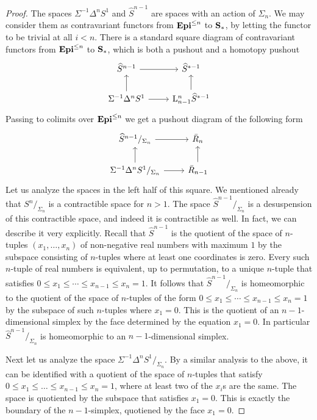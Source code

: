 \documentclass[psamsfonts]{amsart}
\theoremstyle{plain}
\theoremstyle{definition}
\theoremstyle{remark}
\newcommand{\catname}[1]{{\normalfont\textbf{#1}}}
\newcommand{\epi}{\catname{Epi}}
\newcommand{\spaces}{\catname{S}_*}
\newcommand{\lkan}{\mathrm{L}}
\begin{document}
\begin{proof}
The spaces $\Sigma^{-1}\Delta^n S^1$ and $\widehat S^{n-1}$ are spaces with an action of $\Sigma_n$. We may consider them as contravariant functors from $\epi^{\le n}$ to $\spaces$, by letting the functor to be trivial at all $i<n$. There is a standard square diagram of contravariant functors from $\epi^{\le n}$ to $\spaces$, which is both a pushout and a homotopy pushout
\[\begin{tikzcd}
	{\widehat S^{n-1}} & {\widehat S^{*-1}} \\
	{\Sigma^{-1}\Delta^nS^1} & {\lkan_{n-1}^n\widehat S^{*-1}}
	\arrow[from=1-1, to=1-2]
	\arrow[from=2-1, to=1-1]
	\arrow[from=2-1, to=2-2]
	\arrow[from=2-2, to=1-2]
\end{tikzcd}\]
Passing to colimits over $\epi^{\le n}$ we get a pushout diagram of the following form
\[\begin{tikzcd}
	{\widehat S^{n-1}/_{\Sigma_n}} & {\bar R_n} \\
	{\Sigma^{-1}\Delta^nS^1/_{\Sigma_n}} & {\bar R_{n-1}}
	\arrow[from=1-1, to=1-2]
	\arrow[from=2-1, to=1-1]
	\arrow[from=2-1, to=2-2]
	\arrow[from=2-2, to=1-2]
\end{tikzcd}\]
Let us analyze the spaces in the left half of this square. We mentioned already that $S^n/_{\Sigma_n}$ is a contractible space for $n>1$. The space $\widehat S^{n-1}/_{\Sigma_n}$ is a desuspension of this contractible space, and indeed it is contractible as well. In fact, we can describe it very explicitly. Recall that $\widehat S^{n-1}$ is the quotient of the space of $n$-tuples $(x_1, \ldots, x_n)$ of non-negative real numbers with maximum $1$ by the subspace consisting of $n$-tuples where at least one coordinates is zero. Every such $n$-tuple of real numbers is equivalent, up to permutation, to a unique $n$-tuple that satisfies $0\le x_1 \le \cdots \le x_{n-1}\le x_n=1$. It follows that $\widehat S^{n-1}/_{\Sigma_n}$ is homeomorphic to the quotient of the space of $n$-tuples of the form $0 \le x_1 \le \cdots \le x_{n-1}\le x_n=1$ by the subspace of such $n$-tuples where $x_1=0$. This is the quotient of an $n-1$-dimensional simplex by the face determined by the equation $x_1=0$. In particular $\widehat S^{n-1}/_{\Sigma_n}$ is homeomorphic to an $n-1$-dimensional simplex.

Next let us analyze the space ${\Sigma^{-1}\Delta^nS^1/_{\Sigma_n}}$. By a similar analysis to the above, it can be identified with a quotient of the space of $n$-tuples that satisfy $0\le x_1 \le \ldots \le x_{n-1}\le x_n = 1$, where at least two of the $x_i$s are the same. The space is quotiented by the subspace that satisfies $x_1=0$. This is exactly the boundary of the $n-1$-simplex, quotiened by the face $x_1=0$.


\end{proof}
\end{document}
